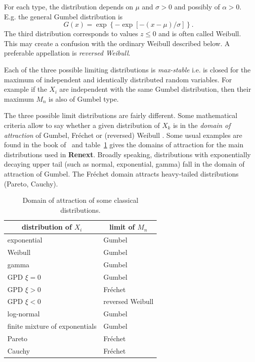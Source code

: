 \documentclass[a4paper]{report}
\begin{document}
For each type, the distribution depends on $\mu$ and $\sigma>0$ and
possibly of $\alpha>0$. E.g. the general Gumbel distribution is
$$
G(x) = \exp\left\{-\exp\left[-(x-\mu)/\sigma\right] \right\}.
$$ 
The third distribution corresponds to values $z \leqslant 0$ and
is often called Weibull. This
may create a confusion with the ordinary Weibull described below. 
A preferable appellation is
\textit{reversed Weibull}.

Each of the three possible limiting distributions is
\textit{max-stable}  i.e. is closed for
the maximum of independent and identically distributed random
variables. For example if the $X_i$ are independent with the same
Gumbel distribution, then their maximum $M_n$ is also of Gumbel type.


The three possible limit distributions are fairly different. Some
mathematical criteria allow to say whether a given distribution of
$X_k$ is in the \textit{domain of attraction} of Gumbel, Fr\'echet or
(reversed) Weibull \citep[chap.~3]{EKM}. Some usual examples are found
in the book of~\citet[chap.~1]{KOTZ} and table~\ref{ATTRACT} gives the
domains of attraction for the main distributions used in
\textbf{Renext}. Broadly speaking, distributions with exponentially
decaying upper tail (such as normal, exponential, gamma) fall in the
domain of attraction of Gumbel. The Fr\'echet domain attracts
heavy-tailed distributions (Pareto, Cauchy).


  \begin{table} 
  \centering  
  \begin{tabular}{l l }
    \toprule
    \multicolumn{1}{c}{\rule{0pt}{11pt} \textbf{distribution of $X_i$}} & 
    \multicolumn{1}{c}{\textbf{limit of} $M_n$ }\\  \toprule
    exponential   & Gumbel\\ 
    Weibull       & Gumbel\\ 
    gamma         & Gumbel\\  \midrule
    GPD $\xi =0$  & Gumbel\\ 
    GPD $\xi >0$  & Fr\'echet\\
    GPD $\xi <0$  & reversed Weibull\\ \midrule
    log-normal    & Gumbel\\ 
    finite mixture of exponentials    &  Gumbel\\  
    Pareto        &  Fr\'echet\\ 
    Cauchy        &  Fr\'echet\\ \toprule
  \end{tabular}
  \caption{\label{ATTRACT}Domain of attraction of some classical distributions.}
\end{table}
\end{document}
